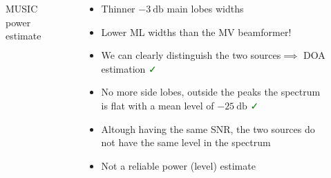 \documentclass[UKenglish,8pt,aspectratio=1610]{beamer}
\begin{document}
\begin{frame}
\begin{columns}
\begin{column}{0.5\textwidth}
\begin{figure}[h!]
			\caption{MUSIC power estimate}
		\end{figure}
	\end{column}
	\begin{column}{0.5\textwidth}
		\begin{itemize}
			\item Thinner $-3~\si{\decibel}$ main lobes widths
			\item Lower ML widths than the MV beamformer!
			\item We can clearly distinguish the two sources$\implies$ DOA estimation \textcolor{green}{\faCheck}
			\item No more side lobes, outside the peaks the spectrum is flat with a mean level of $-25~\si{\decibel}$ \textcolor{green}{\faCheck}
			\item Altough having the same SNR, the two sources do not have the same level in the spectrum
			\item Not a reliable power (level) estimate \textcolor{red}{\faTimes}
		\end{itemize}
	\end{column}
\end{columns}
\end{frame}
\end{document}
